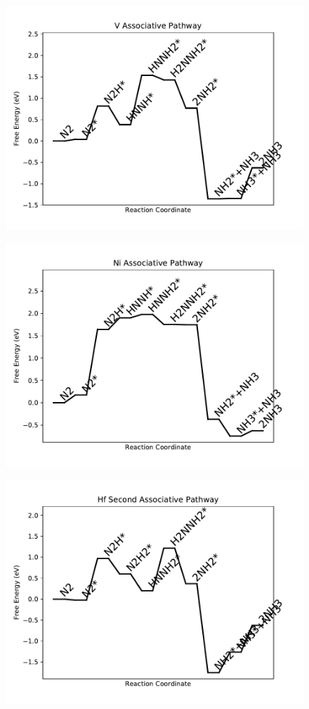 \begin{figure}
\includegraphics[width=0.8\linewidth]{data/plots/V_associative.pdf}
\end{figure}

\begin{figure}
\includegraphics[width=0.8\linewidth]{data/plots/Ni_associative.pdf}
\end{figure}

\begin{figure}
\includegraphics[width=0.8\linewidth]{data/plots/Hf_associative_2.pdf}
\end{figure}

